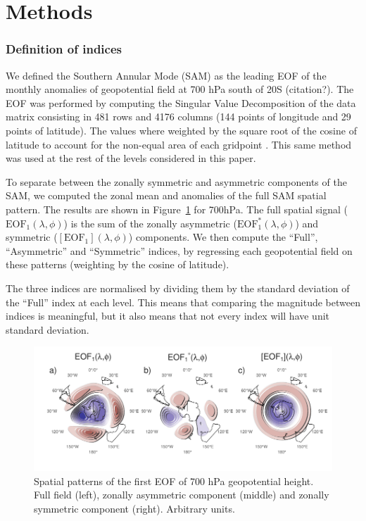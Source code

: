 \documentclass[]{ametsocV5}
\begin{document}
\section{Methods}

\subsubsection{Definition of indices}

We defined the Southern Annular Mode (SAM) as the leading EOF of the
monthly anomalies of geopotential field at 700 hPa south of 20\degree S
(citation?). The EOF was performed by computing the Singular Value
Decomposition of the data matrix consisting in 481 rows and 4176 columns
(144 points of longitude and 29 points of latitude). The values where
weighted by the square root of the cosine of latitude to account for the
non-equal area of each gridpoint \citep{chung1999}. This same method was
used at the rest of the levels considered in this paper.

To separate between the zonally symmetric and asymmetric components of
the SAM, we computed the zonal mean and anomalies of the full SAM
spatial pattern. The results are shown in Figure~\ref{fig:method} for
700hPa. The full spatial signal (\(\mathrm{EOF_1}(\lambda, \phi)\)) is
the sum of the zonally asymmetric (\(\mathrm{EOF_1^*}(\lambda, \phi)\))
and symmetric (\([\mathrm{EOF_1}](\lambda, \phi)\)) components. We then
compute the ``Full'', ``Asymmetric'' and ``Symmetric'' indices, by
regressing each geopotential field on these patterns (weighting by the
cosine of latitude).

The three indices are normalised by dividing them by the standard
deviation of the ``Full'' index at each level. This means that comparing
the magnitude between indices is meaningful, but it also means that not
every index will have unit standard deviation.

\begin{figure}
\includegraphics{method-1} \caption[Spatial patterns of the first EOF of 700 hPa geopotential height]{Spatial patterns of the first EOF of 700 hPa geopotential height. Full field (left), zonally asymmetric component (middle) and zonally symmetric component (right). Arbitrary units.}\label{fig:method}
\end{figure}
\end{document}
